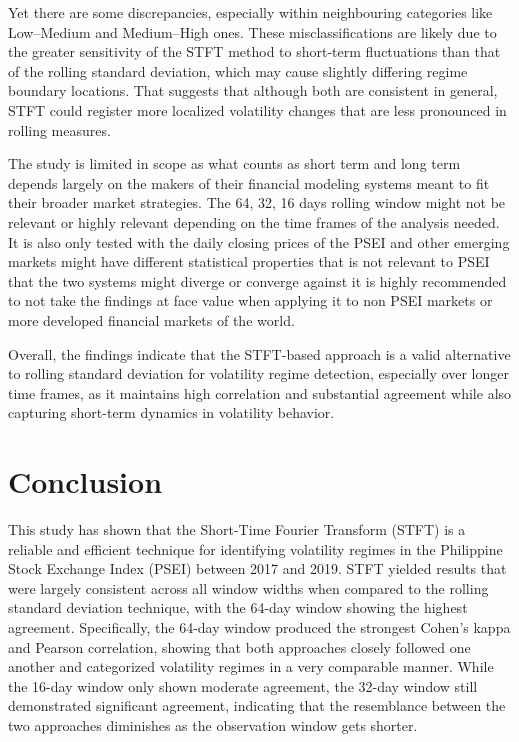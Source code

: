 \documentclass[12pt,letterpaper]{article}
\begin{document}
		Yet there are some discrepancies, especially within neighbouring categories like Low–Medium and Medium–High ones. These misclassifications are likely due to the greater sensitivity of the STFT method to short-term fluctuations than that of the rolling standard deviation, which may cause slightly differing regime boundary locations. That suggests that although both are consistent in general, STFT could register more localized volatility changes that are less pronounced in rolling measures.
		
		The study is limited in scope as what counts as short term and long term depends largely on the makers of their financial modeling systems meant to fit their broader market strategies. The 64, 32, 16 days rolling window might not be relevant or highly relevant depending on the time frames of the analysis needed.
		It is also only tested with the daily closing prices of the PSEI and other emerging markets might have different statistical properties that is not relevant to PSEI that the two systems might diverge or converge against it is highly recommended to not take the findings at face value when applying it to non PSEI markets or more developed financial markets of the world.
		
		Overall, the findings indicate that the STFT-based approach is a valid alternative to rolling standard deviation for volatility regime detection, especially over longer time frames, as it maintains high correlation and substantial agreement while also capturing short-term dynamics in volatility behavior.
		
	\section{Conclusion}
		This study has shown that the Short-Time Fourier Transform (STFT) is a reliable and efficient technique for identifying volatility regimes in the Philippine Stock Exchange Index (PSEI) between 2017 and 2019. STFT yielded results that were largely consistent across all window widths when compared to the rolling standard deviation technique, with the 64-day window showing the highest agreement. Specifically, the 64-day window produced the strongest Cohen's kappa and Pearson correlation, showing that both approaches closely followed one another and categorized volatility regimes in a very comparable manner. While the 16-day window only shown moderate agreement, the 32-day window still demonstrated significant agreement, indicating that the resemblance between the two approaches diminishes as the observation window gets shorter.
		
\end{document}
